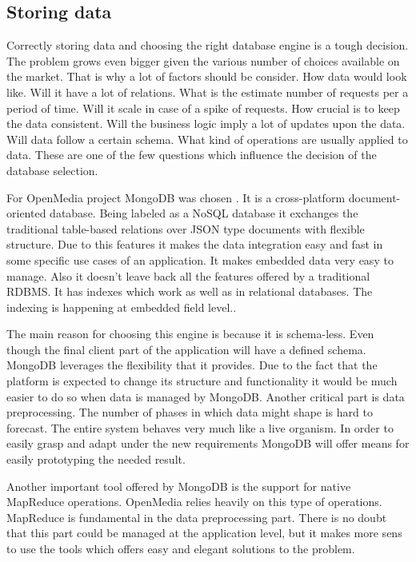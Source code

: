 \subsection{Storing data}
Correctly storing data and choosing the right database engine is a tough decision. The problem grows even bigger given the various number of choices available on the market. That is why a lot of factors should be consider. How data would look like. Will it have a lot of relations. What is the estimate number of requests per a period of time. Will it scale in case of a spike of requests. How crucial is to keep the data consistent. Will the business logic imply a lot of updates upon the data. Will data follow a certain schema. What kind of operations are usually applied to data. These are one of the few questions which influence the decision of the database selection.

For OpenMedia project MongoDB was chosen \cite{mongodb}. It is a cross-platform document-oriented database. Being labeled as a NoSQL database it exchanges the traditional table-based relations over JSON type documents with flexible structure. Due to this features it makes the data integration easy and fast in some specific use cases of an application. It makes embedded data very easy to manage. Also it doesn't leave back all the features offered by a traditional RDBMS. It has indexes which work as well as in relational databases. The indexing is happening at embedded field level..

The main reason for choosing this engine is because it is schema-less. Even though the final client part of the application will have a defined schema. MongoDB leverages the flexibility that it provides. Due to the fact that the platform is expected to change its structure and functionality it would be much easier to do so when data is managed by MongoDB. Another critical part is data preprocessing. The number of phases in which data might shape is hard to forecast. The entire system behaves very much like a live organism. In order to easily grasp and adapt under the new requirements MongoDB will offer means for easily prototyping the needed result.

Another important tool offered by MongoDB is the support for native MapReduce operations. OpenMedia relies heavily on this type of operations. MapReduce is fundamental in the data preprocessing part. There is no doubt that this part could be managed at the application level, but it makes more sens to use the tools which offers easy and elegant solutions to the problem.


